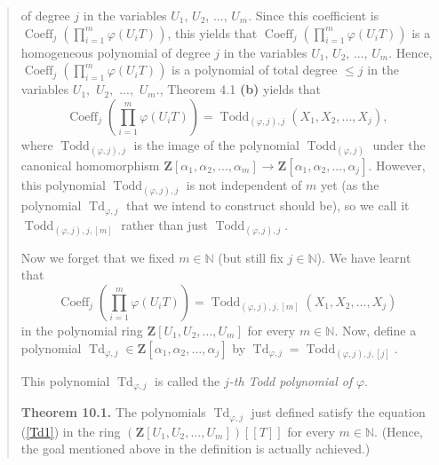 \documentclass[numbers=enddot,12pt,final,onecolumn,notitlepage]{scrartcl}%
\begin{document}
\begin{quote}
{of degree $j$ in the variables $U_{1}$, $U_{2}$, $...$, $U_{m}$. Since this
coefficient is $\operatorname*{Coeff}\nolimits_{j}\left(  \prod\limits_{i=1}%
^{m}\varphi\left(  U_{i}T\right)  \right)  $, this yields that
$\operatorname*{Coeff}\nolimits_{j}\left(  \prod\limits_{i=1}^{m}%
\varphi\left(  U_{i}T\right)  \right)  $ is a homogeneous polynomial of degree
$j$ in the variables $U_{1}$, $U_{2}$, $...$, $U_{m}$. Hence,
$\operatorname*{Coeff}\nolimits_{j}\left(  \prod\limits_{i=1}^{m}%
\varphi\left(  U_{i}T\right)  \right)  $ is a polynomial of total degree $\leq
j$ in the variables $U_{1},$ $U_{2},$ $...,$ $U_{m}$.}, Theorem 4.1
\textbf{(b)} yields that%
\[
\operatorname*{Coeff}\nolimits_{j}\left(  \prod\limits_{i=1}^{m}\varphi\left(
U_{i}T\right)  \right)  =\operatorname*{Todd}\nolimits_{\left(  \varphi
,j\right)  ,j}\left(  X_{1},X_{2},...,X_{j}\right)  ,
\]
where $\operatorname*{Todd}\nolimits_{\left(  \varphi,j\right)  ,j}$ is the
image of the polynomial $\operatorname*{Todd}\nolimits_{\left(  \varphi
,j\right)  }$ under the canonical homomorphism $\mathbf{Z}\left[  \alpha
_{1},\alpha_{2},...,\alpha_{m}\right]  \rightarrow\mathbf{Z}\left[  \alpha
_{1},\alpha_{2},...,\alpha_{j}\right]  $. However, this polynomial
$\operatorname*{Todd}\nolimits_{\left(  \varphi,j\right)  ,j}$ is not
independent of $m$ yet (as the polynomial $\operatorname*{Td}%
\nolimits_{\varphi,j}$ that we intend to construct should be), so we call it
$\operatorname*{Todd}\nolimits_{\left(  \varphi,j\right)  ,j,\left[  m\right]
}$ rather than just $\operatorname*{Todd}\nolimits_{\left(  \varphi,j\right)
,j}$.

Now we forget that we fixed $m\in\mathbb{N}$ (but still fix $j\in\mathbb{N}$).
We have learnt that%
\[
\operatorname*{Coeff}\nolimits_{j}\left(  \prod\limits_{i=1}^{m}\varphi\left(
U_{i}T\right)  \right)  =\operatorname*{Todd}\nolimits_{\left(  \varphi
,j\right)  ,j,\left[  m\right]  }\left(  X_{1},X_{2},...,X_{j}\right)
\]
in the polynomial ring $\mathbf{Z}\left[  U_{1},U_{2},...,U_{m}\right]  $ for
every $m\in\mathbb{N}$. Now, define a polynomial $\operatorname*{Td}%
\nolimits_{\varphi,j}\in\mathbf{Z}\left[  \alpha_{1},\alpha_{2},...,\alpha
_{j}\right]  $ by $\operatorname*{Td}\nolimits_{\varphi,j}%
=\operatorname*{Todd}\nolimits_{\left(  \varphi,j\right)  ,j,\left[  j\right]
}.$

This polynomial $\operatorname*{Td}\nolimits_{\varphi,j}$ is called the
$j$\textit{-th Todd polynomial of }$\varphi$.

\textbf{Theorem 10.1.} The polynomials $\operatorname*{Td}\nolimits_{\varphi
,j}$ just defined satisfy the equation (\ref{Td1}) in the ring $\left(
\mathbf{Z}\left[  U_{1},U_{2},...,U_{m}\right]  \right)  \left[  \left[
T\right]  \right]  $ for every $m\in\mathbb{N}$. (Hence, the goal mentioned
above in the definition is actually achieved.)
\end{quote}
\end{document}
